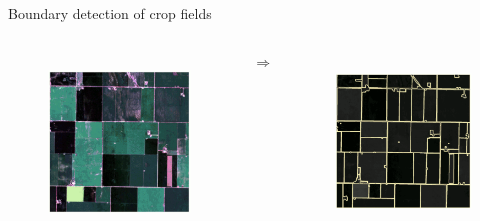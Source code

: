 \documentclass[xcolor=table]{beamer}
\begin{document}
\begin{frame}{Boundary detection of crop fields}
	
	\begin{columns}

		\begin{figure}[htb]
			\centering
			\includegraphics[height=4cm]{figs/field_nodetection.png}
			\label{fig:fieldNoDetection}
		\end{figure}
		\pause

		\begin{columns}
		
		\huge {$\Rightarrow$ }
		
			\begin{figure}[htb]
				\centering
				\includegraphics[height=4cm]{figs/field_detected.png}
				\label{fig:fieldDetected}
			\end{figure}
		\end{columns}
	\end{columns}
	
	~\flushright \tiny \cite{waldner2021}
	
\end{frame}
\end{document}
